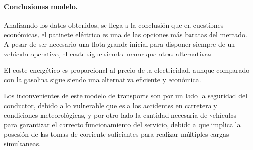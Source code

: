 \paragraph{Conclusiones modelo.}

Analizando los datos obtenidos, se llega a la conclusión que en cuestiones económicas, el patinete eléctrico es una de las opciones más baratas del mercado. A pesar de ser necesario una flota grande inicial para disponer siempre de un vehículo operativo, el coste sigue siendo menor que otras alternativas.

El coste energético es proporcional al precio de la electricidad, aunque comparado con la gasolina sigue siendo una alternativa eficiente y económica.

Los inconvenientes de este modelo de transporte son por un lado la seguridad del conductor, debido a lo vulnerable que es a los accidentes en carretera y condiciones meteorológicas, y por otro lado la cantidad necesaria de vehículos para garantizar el correcto funcionamiento del servicio, debido a que implica la posesión de las tomas de corriente suficientes para realizar múltiples cargas simultaneas.